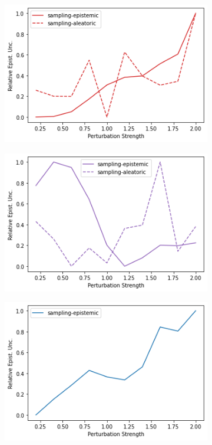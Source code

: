 \begin{figure}
    \begin{subfigure}{.245\textwidth}
        \includegraphics[width=\textwidth]{sections/011_icml2022/resources/action_shift-DropOut-LunarLanderShift-v0-mean_epistemic_uncertainty_.png}
    \end{subfigure}
    \begin{subfigure}{.245\textwidth}
        \includegraphics[width=\textwidth]{sections/011_icml2022/resources/action_shift-Ensemble-LunarLanderShift-v0-mean_epistemic_uncertainty_.png}
    \end{subfigure}
    \begin{subfigure}{.245\textwidth}
        \includegraphics[width=\textwidth]{sections/011_icml2022/resources/action_shift-DKL-LunarLanderShift-v0-mean_epistemic_uncertainty_.png}

\end{subfigure}
\end{figure}
